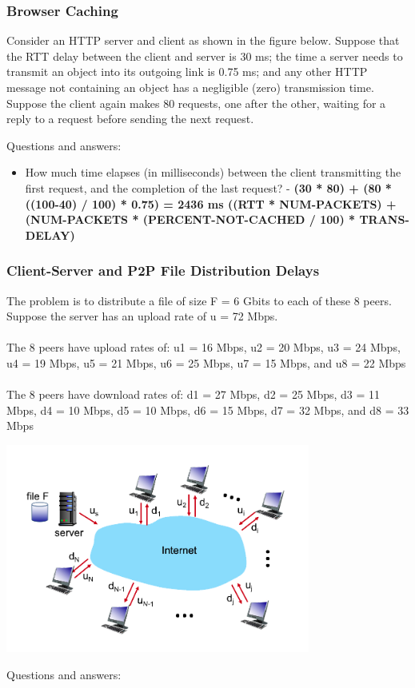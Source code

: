 \documentclass{article}
\begin{document}
\subsubsection{Browser Caching}
Consider an HTTP server and client as shown in the figure below. Suppose that the RTT delay between the client and server is 30 ms; the time a server needs to transmit an object into its outgoing link is 0.75 ms; and any other HTTP message not containing an object has a negligible (zero) transmission time. Suppose the client again makes 80 requests, one after the other, waiting for a reply to a request before sending the next request.

\noindent Questions and answers:

\begin{itemize}
	\item How much time elapses (in milliseconds) between the client transmitting the first request, and the completion of the last request? - \textbf{(30 * 80) + (80 * ((100-40) / 100) * 0.75) = 2436 ms ((RTT * NUM-PACKETS) + (NUM-PACKETS * (PERCENT-NOT-CACHED / 100) * TRANS-DELAY)}
\end{itemize}

\subsubsection{Client-Server and P2P File Distribution Delays}
The problem is to distribute a file of size F = 6 Gbits to each of these 8 peers. Suppose the server has an upload rate of u = 72 Mbps. \\ \\
The 8 peers have upload rates of: u1 = 16 Mbps, u2 = 20 Mbps, u3 = 24 Mbps, u4 = 19 Mbps, u5 = 21 Mbps, u6 = 25 Mbps, u7 = 15 Mbps, and u8 = 22 Mbps \\ \\ 
The 8 peers have download rates of: d1 = 27 Mbps, d2 = 25 Mbps, d3 = 11 Mbps, d4 = 10 Mbps, d5 = 10 Mbps, d6 = 15 Mbps, d7 = 32 Mbps, and d8 = 33 Mbps \\

\centerline{\includegraphics[width=10cm]{assets/ex9}}
\noindent Questions and answers:
\end{document}
